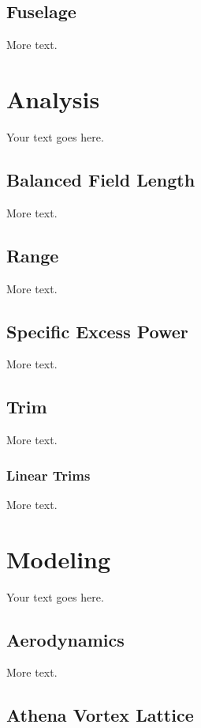 \documentclass[11pt]{article} %
\begin{document}
\subsection{Fuselage}

More text.

\section{Analysis}

Your text goes here.

\subsection{Balanced Field Length}

More text.

\subsection{Range}

More text.

\subsection{Specific Excess Power}

More text.

\subsection{Trim}

More text.

\subsubsection{Linear Trims}

More text.

\section{Modeling}

Your text goes here.

\subsection{Aerodynamics}

More text.

\subsection{Athena Vortex Lattice}
\end{document}
